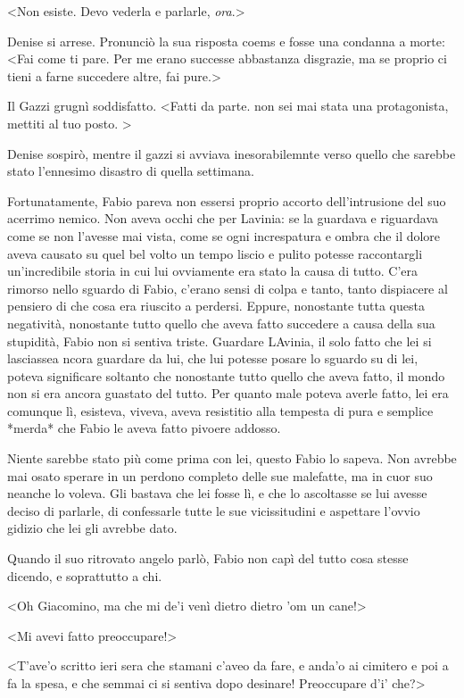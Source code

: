 <Non esiste. Devo vederla e parlarle, \emph{ora}.>

Denise si arrese. Pronunciò la sua risposta coems e fosse una condanna a morte: <Fai come ti pare. Per me erano successe abbastanza disgrazie, ma se proprio ci tieni a farne succedere altre, fai pure.>

Il Gazzi grugnì soddisfatto. <Fatti da parte. non sei mai stata una protagonista, mettiti al tuo posto. >

Denise sospirò, mentre il gazzi si avviava inesorabilemnte verso quello che sarebbe stato l'ennesimo disastro di quella settimana.

Fortunatamente, Fabio pareva non essersi proprio accorto dell'intrusione del suo acerrimo nemico. Non aveva occhi che per Lavinia: se la guardava e riguardava come se non l'avesse mai vista, come se ogni increspatura e ombra che il dolore aveva causato su quel bel volto un tempo liscio e pulito potesse raccontargli un'incredibile storia in cui lui ovviamente era stato la causa di tutto. C'era rimorso nello sguardo di Fabio, c'erano sensi di colpa e tanto, tanto dispiacere al pensiero di che cosa era riuscito a perdersi. Eppure, nonostante tutta questa negatività, nonostante tutto quello che aveva fatto succedere a causa della sua stupidità, Fabio non si sentiva triste. Guardare LAvinia, il solo fatto che lei si lasciassea ncora guardare da lui, che lui potesse posare lo sguardo su di lei, poteva significare soltanto che nonostante tutto quello che aveva fatto, il mondo non si era ancora guastato del tutto. Per quanto male poteva averle fatto, lei era comunque lì, esisteva, viveva, aveva resistitio alla tempesta di pura e semplice *merda* che Fabio le aveva fatto pivoere addosso.

Niente sarebbe stato più come prima con lei, questo Fabio lo sapeva. Non avrebbe mai osato sperare in un perdono completo delle sue malefatte, ma in cuor suo neanche lo voleva. Gli bastava che lei fosse lì, e che lo ascoltasse se lui avesse deciso di parlarle, di confessarle tutte le sue vicissitudini e aspettare l'ovvio gidizio che lei gli avrebbe dato.

Quando il suo ritrovato angelo parlò, Fabio non capì del tutto cosa stesse dicendo, e soprattutto a chi.

<Oh Giacomino, ma che mi de'i venì dietro dietro 'om un cane!>

<Mi avevi fatto preoccupare!>

<T'ave'o scritto ieri sera che stamani c'aveo da fare, e anda'o ai cimitero e poi a fa la spesa, e che semmai ci si sentiva dopo desinare! Preoccupare d'i' che?>

